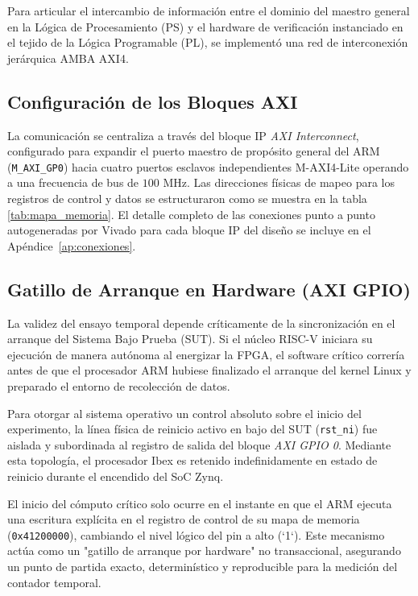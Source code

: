 Para articular el intercambio de información entre el dominio del maestro general en la Lógica de Procesamiento (PS) y el hardware de verificación instanciado en el tejido de la Lógica Programable (PL), se implementó una red de interconexión jerárquica AMBA AXI4.

\subsection{Configuración de los Bloques AXI}
\label{ssec:config_axi}

La comunicación se centraliza a través del bloque IP \textit{AXI
    Interconnect}, configurado para expandir el puerto maestro de
    propósito general del ARM (\texttt{M\_AXI\_GP0}) hacia cuatro puertos
    esclavos independientes M-AXI4-Lite operando a una frecuencia de bus
    de $100\text{ MHz}$. Las direcciones físicas de mapeo para los
    registros de control y datos se estructuraron como se muestra en la
    tabla \ref{tab:mapa_memoria}. El detalle completo de las conexiones
    punto a punto autogeneradas por Vivado para cada bloque IP del
    diseño se incluye en el Apéndice~\ref{ap:conexiones}.


\subsection{Gatillo de Arranque en Hardware (AXI GPIO)}
\label{ssec:gatillo_arranque}

La validez del ensayo temporal depende críticamente de la sincronización en el arranque del Sistema Bajo Prueba (SUT). Si el núcleo RISC-V iniciara su ejecución de manera autónoma al energizar la FPGA, el software crítico correría antes de que el procesador ARM hubiese finalizado el arranque del kernel Linux y preparado el entorno de recolección de datos.

Para otorgar al sistema operativo un control absoluto sobre el inicio del experimento, la línea física de reinicio activo en bajo del SUT (\texttt{rst\_ni}) fue aislada y subordinada al registro de salida del bloque \textit{AXI GPIO 0}. Mediante esta topología, el procesador Ibex es retenido indefinidamente en estado de reinicio durante el encendido del SoC Zynq. 

El inicio del cómputo crítico solo ocurre en el instante en que el ARM ejecuta una escritura explícita en el registro de control de su mapa de memoria (\texttt{0x41200000}), cambiando el nivel lógico del pin a alto (`1`). Este mecanismo actúa como un "gatillo de arranque por hardware" no transaccional, asegurando un punto de partida exacto, determinístico y reproducible para la medición del contador temporal.

